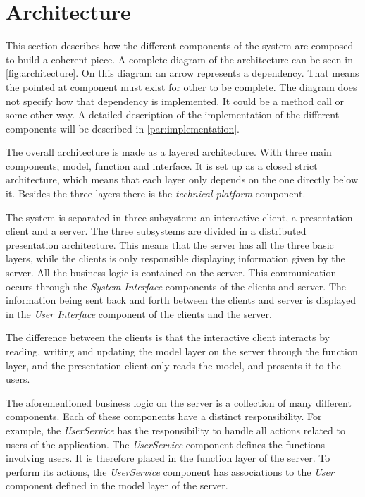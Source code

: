 \section{Architecture}
\label{sec:architecture}

This section describes how the different components of the system are
composed to build a coherent piece. A complete diagram of the architecture can be seen in \cref{fig:architecture}. On this diagram an arrow represents a dependency. That means the pointed at component must exist for other to be complete. The diagram does not specify how that dependency is implemented. It could be a method call or some other way. A detailed description of the implementation of the different components will be described in \cref{par:implementation}.

The overall architecture is made as a layered architecture. With three main components; model, function and interface. It is set up as a closed strict architecture, which means that each layer only depends on the one directly below it. Besides the three layers there is the \emph{technical platform} component.

The system is separated in three subsystem: an interactive client, a presentation client and a server. The three subsystems are divided in a distributed presentation architecture. This means that the server has all the three basic layers, while the clients is only responsible displaying information given by the server. All the business logic is contained on the
server. This communication occurs through the \textit{System Interface}
components of the clients and server. The information being sent back and
forth between the clients and server is displayed in the \textit{User Interface}
component of the clients and the server.

The difference between the clients is that the interactive client interacts by reading, writing and updating the model layer on the server through the function layer, and the presentation client only reads the model, and presents it to the users.

The aforementioned business logic on the server is a collection of
many different components. Each of these components have a distinct
responsibility. For example, the \textit{UserService} has the responsibility to
handle all actions related to users of the application. The
\textit{UserService} component defines the functions involving users. It is
therefore placed in the function layer of the server. To perform its
actions, the \textit{UserService} component has associations to the \textit{User}
component defined in the model layer of the server.

